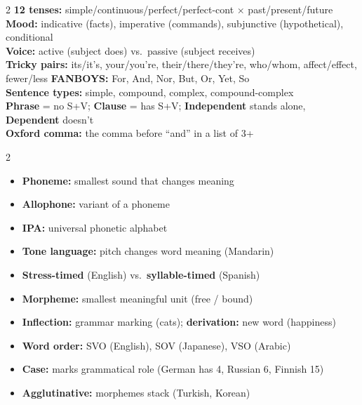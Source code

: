 \documentclass[11pt, letterpaper]{article}
\begin{document}
\begin{tcolorbox}[colback=part4bg, colframe=sectionorange,
  title={\bfseries Grammar Mechanics}, arc=3pt, boxrule=1pt]
\footnotesize
\begin{multicols}{2}
\textbf{12 tenses:} simple/continuous/perfect/perfect-cont $\times$ past/present/future\\
\textbf{Mood:} indicative (facts), imperative (commands), subjunctive (hypothetical), conditional\\
\textbf{Voice:} active (subject does) vs.\ passive (subject receives)\\
\textbf{Tricky pairs:} its/it's, your/you're, their/there/they're, who/whom, affect/effect, fewer/less
\columnbreak
\textbf{FANBOYS:} For, And, Nor, But, Or, Yet, So\\
\textbf{Sentence types:} simple, compound, complex, compound-complex\\
\textbf{Phrase} = no S+V; \textbf{Clause} = has S+V; \textbf{Independent} stands alone, \textbf{Dependent} doesn't\\
\textbf{Oxford comma:} the comma before ``and'' in a list of 3+
\end{multicols}
\end{tcolorbox}

\vspace{4pt}

\begin{tcolorbox}[colback=part5bg, colframe=sectionteal,
  title={\bfseries Phonology, Morphology \& Syntax}, arc=3pt, boxrule=1pt]
\footnotesize
\begin{multicols}{2}
\begin{itemize}[noitemsep, leftmargin=*]
  \item \textbf{Phoneme:} smallest sound that changes meaning
  \item \textbf{Allophone:} variant of a phoneme
  \item \textbf{IPA:} universal phonetic alphabet
  \item \textbf{Tone language:} pitch changes word meaning (Mandarin)
  \item \textbf{Stress-timed} (English) vs.\ \textbf{syllable-timed} (Spanish)
\end{itemize}
\columnbreak
\begin{itemize}[noitemsep, leftmargin=*]
  \item \textbf{Morpheme:} smallest meaningful unit (free / bound)
  \item \textbf{Inflection:} grammar marking (cats); \textbf{derivation:} new word (happiness)
  \item \textbf{Word order:} SVO (English), SOV (Japanese), VSO (Arabic)
  \item \textbf{Case:} marks grammatical role (German has 4, Russian 6, Finnish 15)
  \item \textbf{Agglutinative:} morphemes stack (Turkish, Korean)
\end{itemize}
\end{multicols}
\end{tcolorbox}
\end{document}
